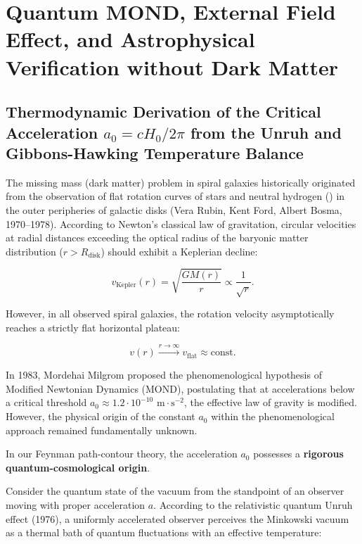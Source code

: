 \section{Quantum MOND, External Field Effect, and Astrophysical Verification without Dark Matter}\label{sec:rozdil4}

\subsection{Thermodynamic Derivation of the Critical Acceleration $a_0 = c H_0 / 2\pi$ from the Unruh and Gibbons-Hawking Temperature Balance}\label{sec:4.1}

The missing mass (dark matter) problem in spiral galaxies historically originated from the observation of flat rotation curves of stars and neutral hydrogen () in the outer peripheries of galactic disks (Vera Rubin, Kent Ford, Albert Bosma, 1970--1978). According to Newton's classical law of gravitation, circular velocities at radial distances exceeding the optical radius of the baryonic matter distribution ($r > R_{\text{disk}}$) should exhibit a Keplerian decline:

\begin{equation}\label{eq:4.1}\tag{4.1}
v_{\text{Kepler}}(r) = \sqrt{\frac{G M(r)}{r}} \propto \frac{1}{\sqrt{r}}.
\end{equation}

However, in all observed spiral galaxies, the rotation velocity asymptotically reaches a strictly flat horizontal plateau:

\begin{equation}\label{eq:4.2}\tag{4.2}
v(r) \xrightarrow{r \to \infty} v_{\text{flat}} \approx \text{const}.
\end{equation}

In 1983, Mordehai Milgrom \cite{ref23} proposed the phenomenological hypothesis of Modified Newtonian Dynamics (MOND), postulating that at accelerations below a critical threshold $a_0 \approx 1.2 \cdot 10^{-10}\text{ m}\cdot\text{s}^{-2}$, the effective law of gravity is modified. However, the physical origin of the constant $a_0$ within the phenomenological approach remained fundamentally unknown.

In our Feynman path-contour theory, the acceleration $a_0$ possesses a \textbf{rigorous quantum-cosmological origin}.

Consider the quantum state of the vacuum from the standpoint of an observer moving with proper acceleration $a$. According to the relativistic quantum Unruh effect \cite{ref24} (1976), a uniformly accelerated observer perceives the Minkowski vacuum as a thermal bath of quantum fluctuations with an effective temperature:

